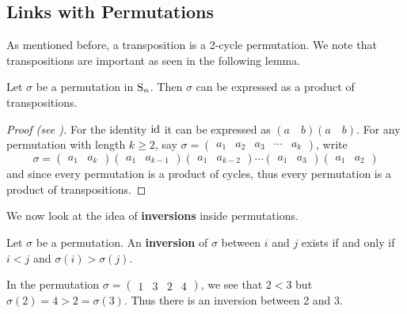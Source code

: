 \subsection{Links with Permutations}
As mentioned before, a transposition is a 2-cycle permutation. We note that transpositions are important as seen in the following lemma.
\begin{lemma}\label{lemma-permutations-as-product-of-transpositions}
    Let $\sigma$ be a permutation in $\mathrm{S}_{n}$. Then $\sigma$ can be expressed as a product of transpositions.
\end{lemma}
\begin{proof}[Proof (see {\cite[\S 80 Corollary]{clark_1984}})]
    For the identity $\mathrm{id}$ it can be expressed as $(a\quad b)(a \quad b)$. For any permutation with length $k \geq 2$, say $\sigma = \begin{pmatrix}a_1 & a_2 & a_3 & \cdots & a_k\end{pmatrix}$, write
    \[
        \sigma = \begin{pmatrix}a_1 & a_k\end{pmatrix}\begin{pmatrix}a_1 & a_{k-1}\end{pmatrix}\begin{pmatrix}a_1 & a_{k-2}\end{pmatrix}\cdots\begin{pmatrix}a_1 & a_3\end{pmatrix}\begin{pmatrix}a_1 & a_2\end{pmatrix}
    \]
    and since every permutation is a product of cycles, thus every permutation is a product of transpositions.
\end{proof}

We now look at the idea of \textbf{inversions} inside permutations.
\begin{definition}
    Let $\sigma$ be a permutation. An \textbf{inversion} of $\sigma$ between $i$ and $j$ exists if and only if $i < j$ and $\sigma(i) > \sigma(j)$.
\end{definition}

\begin{example}
    In the permutation $\sigma = \begin{pmatrix}1 & 3 & 2 & 4\end{pmatrix}$, we see that $2 < 3$ but $\sigma(2) = 4 > 2 = \sigma(3)$. Thus there is an inversion between 2 and 3.
\end{example}

